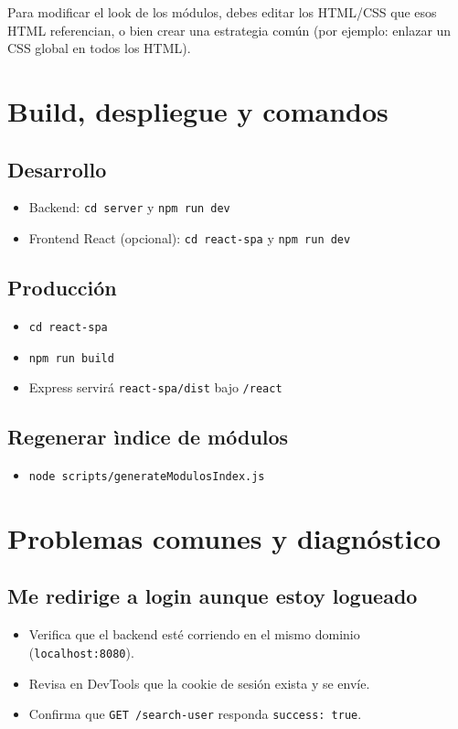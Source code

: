 \documentclass[12pt,a4paper]{article}
\begin{document}
Para modificar el look de los m\'odulos, debes editar los HTML/CSS que esos HTML referencian, o bien crear una estrategia com\'un (por ejemplo: enlazar un CSS global en todos los HTML).

\section{Build, despliegue y comandos}
\subsection{Desarrollo}
\begin{itemize}[leftmargin=*]
  \item Backend: \texttt{cd server} y \texttt{npm run dev}
  \item Frontend React (opcional): \texttt{cd react-spa} y \texttt{npm run dev}
\end{itemize}

\subsection{Producci\'on}
\begin{itemize}[leftmargin=*]
  \item \texttt{cd react-spa}
  \item \texttt{npm run build}
  \item Express servir\'a \texttt{react-spa/dist} bajo \texttt{/react}
\end{itemize}

\subsection{Regenerar \`indice de m\'odulos}
\begin{itemize}[leftmargin=*]
  \item \texttt{node scripts/generateModulosIndex.js}
\end{itemize}

\section{Problemas comunes y diagn\'ostico}
\subsection{Me redirige a login aunque estoy logueado}
\begin{itemize}[leftmargin=*]
  \item Verifica que el backend est\'e corriendo en el mismo dominio (\texttt{localhost:8080}).
  \item Revisa en DevTools que la cookie de sesi\'on exista y se env\'ie.
  \item Confirma que \texttt{GET /search-user} responda \texttt{success: true}.
\end{itemize}
\end{document}
